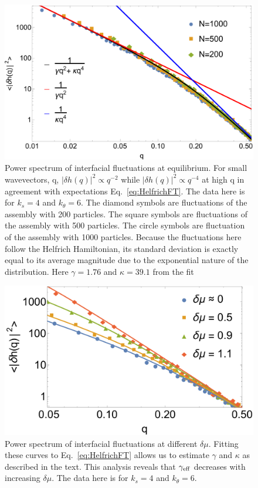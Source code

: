 \documentclass[amsmath,preprintnumbers,10pt,nofootinbib,prl,twocolumn]{revtex4-1}
\begin{document}
\begin{figure}[tbb]
\centering
\includegraphics[scale=0.29]{Fig2.pdf}
\caption{Power spectrum of interfacial fluctuations at equilibrium. For small wavevectors, q, $|\delta h(q)|^2\propto q^{-2}$ while $|\delta h(q)|^2\propto q^{-4}$ at high q in agreement with expectations Eq.~\ref{eq:HelfrichFT}. The data here is for $k_s=4$ and $k_\theta = 6$. The diamond symbols are fluctuations of the assembly with 200 particles. The square symbols are fluctuations of the assembly with 500 particles. The circle symbols are fluctuation of the assembly with 1000 particles. Because the fluctuations here follow the Helfrich Hamiltonian, its standard deviation is exactly equal to its average magnitude due to the exponential nature of the distribution. Here $\gamma = 1.76$ and $\kappa =39.1$ from the fit} \label{fig:HelfrichScaling}
\end{figure}

\begin{figure}[tbb]
\centering
\includegraphics[scale=0.34]{Fig3.pdf}
\caption{Power spectrum of interfacial fluctuations at different $\delta\mu$. Fitting these curves to Eq.~\ref{eq:HelfrichFT} allows us to estimate $\gamma$ and $\kappa$ as described in the text. This analysis reveals that $\gamma_{\rm eff}$ decreases with increasing $\delta\mu$. The data here is for $k_s=4$ and $k_\theta = 6$.} \label{fig:Helfrich}
\end{figure}
\end{document}
